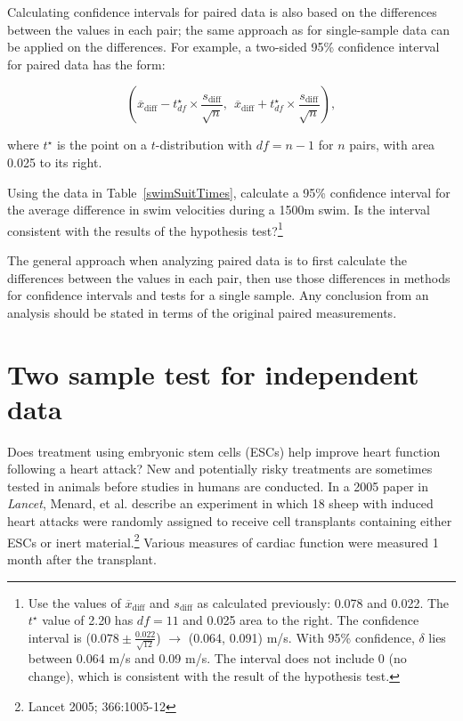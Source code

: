 
Calculating confidence intervals for paired data is also based on the differences between the values in each pair; the same approach as for single-sample data can be applied on the differences. For example, a two-sided 95\% confidence interval for paired data has the form:

\[ \left(
  \overline{x}_{\text{diff}} - t^\star_{df} \times \frac{s_{\text{diff}}}{\sqrt{n}},
  \:\: \overline{x}_{\text{diff}} + t^\star_{df} \times \frac{s_{\text{diff}}}{\sqrt{n}} \right), 
\] 

where $t^\star$ is the point on a $t$-distribution with $df = n - 1$ for $n$ pairs, with area 0.025 to its right.

\begin{exercise} 
Using the data in Table~\ref{swimSuitTimes}, calculate a 95\% confidence interval for the average difference in swim velocities during a 1500m swim. Is the interval consistent with the results of the hypothesis test?\footnote{Use the values of $\overline{x}_{\text{diff}}$ and $s_{\text{diff}}$ as calculated previously: 0.078 and 0.022. The $t^\star$ value of 2.20 has $df = 11$ and 0.025 area to the right. The confidence interval is ($0.078 \pm \frac{0.022}{\sqrt{12}}$) $\to$ (0.064, 0.091) m/s. With 95\% confidence, $\delta$ lies between 0.064 m/s and 0.09 m/s. The interval does not include 0 (no change), which is consistent with the result of the hypothesis test.}
\end{exercise}

The general approach when analyzing paired data is to first calculate the differences between the values in each pair, then use those differences in methods for confidence intervals and tests for a single sample.  Any conclusion from an analysis should be stated in terms of the original paired measurements.


\section{Two sample test for independent data}
\label{differenceOfTwoMeans}

Does treatment using embryonic stem cells (ESCs) help improve heart function following a heart attack? New and potentially risky treatments are sometimes tested in animals before studies in humans are conducted.  In a 2005 paper in \textit{Lancet}, Menard, et al. describe an experiment in which 18 sheep with induced heart attacks were randomly assigned to receive cell transplants containing either ESCs or inert material.\footnote{Lancet 2005; 366:1005-12}  Various measures of cardiac function were measured 1 month after the transplant.

